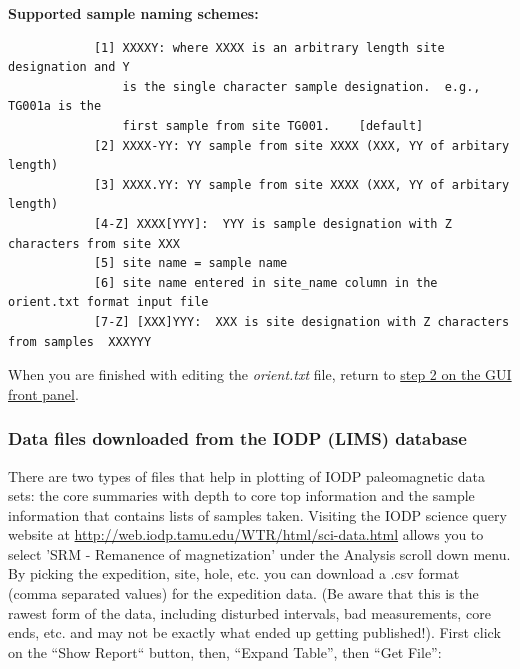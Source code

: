 \documentclass[11pt]{book}
\begin{document}
{ 

{\bf Supported sample naming schemes:}

\begin{verbatim}
            [1] XXXXY: where XXXX is an arbitrary length site designation and Y
                is the single character sample designation.  e.g., TG001a is the
                first sample from site TG001.    [default]
            [2] XXXX-YY: YY sample from site XXXX (XXX, YY of arbitary length)
            [3] XXXX.YY: YY sample from site XXXX (XXX, YY of arbitary length)
            [4-Z] XXXX[YYY]:  YYY is sample designation with Z characters from site XXX
            [5] site name = sample name
            [6] site name entered in site_name column in the orient.txt format input file
            [7-Z] [XXX]YYY:  XXX is site designation with Z characters from samples  XXXYYY
\end{verbatim}

When you are finished with editing the {\it orient.txt} file,  return to  \href{#orient}{step 2 on the GUI front panel}.


%
%
%
%


\subsubsection{Data files downloaded from the IODP (LIMS) database}


There are two types of files that help in plotting of IODP paleomagnetic data sets: the core summaries with depth to core top information and the sample information that contains lists of samples taken.
Visiting the IODP science query website at \url{http://web.iodp.tamu.edu/WTR/html/sci-data.html} allows you to
select 'SRM - Remanence of magnetization' under the Analysis scroll down menu.  By picking the expedition, site, hole, etc. you can download a  .csv format (comma separated values) for the expedition data.  (Be aware that this is the rawest form of the data, including disturbed intervals, bad measurements, core ends, etc. and may not be exactly what ended up getting published!).   First click on the ``Show Report`` button, then, ``Expand Table'', then ``Get File'':

}
\end{document}

